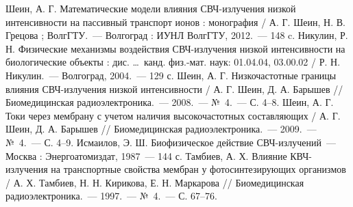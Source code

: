 \def\bibname{СПИСОК ИСПОЛЬЗОВАННЫХ ИСТОЧНИКОВ}
\begin{thebibliography}{99}
 Шеин, А. Г. Математические модели влияния СВЧ-излучения низкой
    интенсивности на пассивный транспорт ионов : монография / А. Г. Шеин, Н. В.
    Грецова ; ВолгГТУ.~--- Волгоград : ИУНЛ ВолгГТУ, 2012.~--- 148 c.
 Никулин, Р. Н. Физические механизмы воздействия СВЧ-излучения
    низкой интенсивности на биологические объекты : дис. \ldots\ канд. физ.-мат.
    наук: 01.04.04, 03.00.02 / Р. Н. Никулин.~--- Волгоград, 2004.~--- 129 с.
 Шеин, А. Г. Низкочастотные границы влияния СВЧ-излучения низкой
    интенсивности / А. Г. Шеин, Д. А. Барышев // Биомедицинская радиоэлектроника.~---
    2008.~--- №~4.~--- С. 4--8.
 Шеин, А. Г. Токи через мембрану с учетом наличия высокочастотных
    составляющих / А. Г. Шеин, Д. А. Барышев // Биомедицинская радиоэлектроника.~---
    2009.~--- №~4.~--- С. 4--9.
 Исмаилов, Э. Ш. Биофизическое действие СВЧ-излучений~---
    Москва : Энергоатомиздат, 1987~--- 144 с.
 Тамбиев, А. Х. Влияние КВЧ-излучения на транспортные свойства
    мембран у фотосинтезирующих организмов / А. Х. Тамбиев, Н. Н. Кирикова,
    Е. Н. Маркарова // Биомедицинская радиоэлектроника.~--- 1997.~--- №~4.~--- С.
    67--76.


\end{thebibliography}
